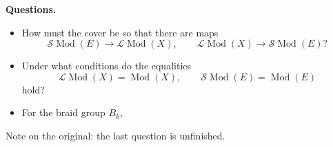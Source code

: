 {\bf Questions.}
\begin{itemize}
\item How must the cover be so that
there are maps
$$
\mathcal{S}\operatorname{Mod}(E)\to
\mathcal{L}\operatorname{Mod}(X),
\qquad
\mathcal{L}\operatorname{Mod}(X)\to
\mathcal{S}\operatorname{Mod}(E)?
$$
\item Under what conditions do the
equalities
$$
\mathcal{L}\operatorname{Mod}(X)
=\operatorname{Mod}(X),
\qquad
\mathcal{S}\operatorname{Mod}(E)
=\operatorname{Mod}(E)
$$
hold?
\item For the braid group $B_k$,
\end{itemize}
Note on the original: the last question
is unfinished.





